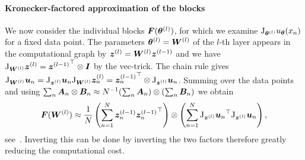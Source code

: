 \paragraph{Kronecker-factored approximation of the blocks}
We now consider the individual blocks ${\bm{F}}({\bm{\theta}}^{(l)})$, for which we examine $\mathrm{J}_{{\bm{\theta}}^{(l)}} u_{{\bm{\theta}}}(x_n)$ for a fixed data point.
The parameters ${\bm{\theta}}^{(l)} = {\bm{W}}^{(l)}$ of the $l$-th layer appears in the computational graph by ${\bm{z}}^{(l)} = {\bm{W}}^{(l)}{\bm{z}}^{(l-1)}$ and %
we have $\mathrm{J}_{{\bm{W}}^{(l)}} {\bm{z}}^{(l)} = {{\bm{z}}^{(l-1)}}^\top \otimes {\bm{I}}$ by the vec-trick.
The chain rule gives
    $\jac_{\mW^{(l)}} \vu_n%
     = \jac_{\vz^{(l)}}  \vu_n \jac_{\mW^{(l)}} \vz_n^{(l)}%
    = {\vz^{(l-1)}_n}^\top\otimes  \jac_{\vz^{(l)}}  \vu_n$. %
Summing over the data points and using  $\sum_n {\bm{A}}_n \otimes {\bm{B}}_n \approx N^{-1}(\sum_n {\bm{A}}_n) \otimes (\sum_n {\bm{B}}_n)$ %
 we obtain
\begin{equation}
    \mF(\mW^{(l)}) %
    \approx \frac1N\left(\sum_{n=1}^N \vz^{(l-1)}_n {\vz^{(l-1)}_n}^\top \right)\otimes \left(\sum_{n=1}^N
    {\jac_{\vz^{(l)}}  \vu_n}^\top
    \jac_{\vz^{(l)}}  \vu_n
    \right),
\end{equation}
see~\citep{eschenhagen2023kroneckerfactored}.
Inverting this can be done by inverting the two factors therefore greatly reducing the computational cost.


